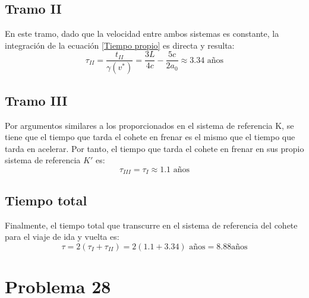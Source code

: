 \documentclass[11pt]{article}
\begin{document}
\subsection*{Tramo II}
En este tramo, dado que la velocidad entre ambos sistemas es constante, la integración de la ecuación \eqref{Tiempo propio} es directa y resulta: 
\begin{equation}
    \tau_{II} = \dfrac{t_{II}}{\gamma(v^*)}=\dfrac{3L}{4c} - \dfrac{5c}{2a_0} \approx 3.34 \textrm{ años}
\end{equation}
\subsection*{Tramo III}
Por argumentos similares a los proporcionados en el sistema de referencia K, se tiene que el tiempo que tarda el cohete en frenar es el mismo que el tiempo que tarda en acelerar. Por tanto, el tiempo que tarda el cohete en frenar en sus propio sistema de referencia $K'$ es:
\begin{equation}
    \tau_{III} = \tau_I \approx 1.1 \textrm{ años}
\end{equation}
\subsection*{Tiempo total}
Finalmente, el tiempo total que transcurre en el sistema de referencia del cohete para el viaje de ida y vuelta es:
\begin{equation}
    \tau = 2(\tau_I + \tau_{II}) = 2(1.1 + 3.34) \textrm{ años} = 8.88 \textrm{años} 
\end{equation}
\section*{Problema 28}
\end{document}
